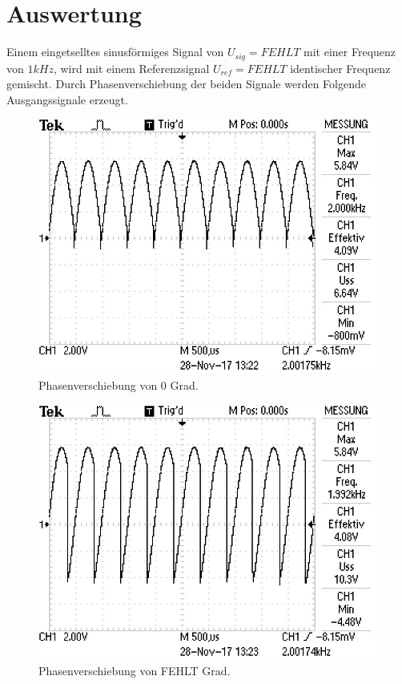 \section{Auswertung}
\label{sec:Auswertung}

Einem eingetselltes sinusförmiges Signal von $U_{sig} = FEHLT$ mit einer Frequenz von $1 kHz$,
wird mit einem Referenzsignal $U_{ref} = FEHLT$ identischer Frequenz gemischt.
Durch Phasenverschiebung der beiden Signale werden Folgende Ausgangssignale erzeugt.

\begin{figure}
  \centering
  \includegraphics{Phase1.jpg}
  \caption{Phasenverschiebung von 0 Grad.}
  \label{fig:Phase1}
\end{figure}

\begin{figure}
  \centering
  \includegraphics{Phase2.jpg}
  \caption{Phasenverschiebung von FEHLT Grad.}
  \label{fig:Phase2}
\end{figure}

